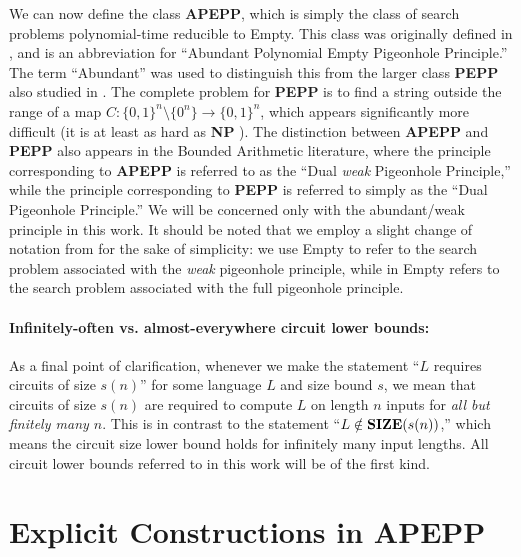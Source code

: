 \documentclass[11pt]{article}
\def\cl{\bf}
\begin{document}
We can now define the class {\cl APEPP}, which is simply the class of search problems polynomial-time reducible to {\sc Empty}. This class was originally defined in \cite{total}, and is an abbreviation for ``Abundant Polynomial Empty Pigeonhole Principle.'' The term ``Abundant'' was used to distinguish this from the larger class {\cl PEPP} also studied in \cite{total}. The complete problem for {\cl PEPP} is to find a string outside the range of a map $C:\{0,1\}^n \setminus \{0^n\} \rightarrow \{0,1\}^n$, which appears significantly more difficult (it is at least as hard as {\cl NP} \cite{total}). The distinction between {\cl APEPP} and {\cl PEPP} also appears in the Bounded Arithmetic literature, where the principle corresponding to {\cl APEPP} is referred to as the ``Dual \emph{weak} Pigeonhole Principle,'' while the principle corresponding to {\cl PEPP} is referred to simply as the ``Dual Pigeonhole Principle.'' We will be concerned only with the abundant/weak principle in this work. It should be noted that we employ a slight change of notation from \cite{total} for the sake of simplicity: we use {\sc Empty} to refer to the search problem associated with the \emph{weak} pigeonhole principle, while in \cite{total} {\sc Empty} refers to the search problem associated with the full pigeonhole principle.

\paragraph{Infinitely-often vs. almost-everywhere circuit lower bounds:} As a final point of clarification, whenever we make the statement ``$L$ requires circuits of size $s(n)$'' for some language $L$ and size bound $s$, we mean that circuits of size $s(n)$ are required to compute $L$ on length $n$ inputs for \emph{all but finitely many $n$}. This is in contrast to the statement ``$L \notin {\cl SIZE}(s(n))$,'' which means the circuit size lower bound holds for infinitely many input lengths. All circuit lower bounds referred to in this work will be of the first kind.

\section{Explicit Constructions in {\cl APEPP}}\label{sec:constructions-in-apepp}
\end{document}
